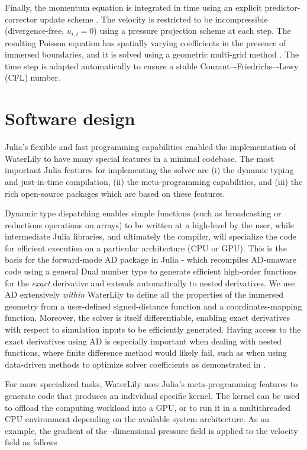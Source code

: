 \documentclass[10pt,a4paper]{article}
\begin{document}
Finally, the momentum equation is integrated in time using an explicit predictor-corrector update scheme \citep{Lauber2022}. The velocity is restricted to be incompressible (divergence-free, $u_{i,i}=0$) using a pressure projection scheme at each step. The resulting Poisson equation has spatially varying coefficients in the presence of immersed boundaries, and it is solved using a geometric multi-grid method \citep{Weymouth2022}. The time step is adapted automatically to ensure a stable Courant–-Friedrichs–-Lewy (CFL) number.

\section{Software design}\label{sec:software_design}

Julia’s flexible and fast programming capabilities enabled the implementation of WaterLily to have many special features in a minimal codebase. The most important Julia features for implementing the solver are (i) the dynamic typing and just-in-time compilation, (ii) the meta-programming capabilities, and (iii) the rich open-source packages which are based on these features.

Dynamic type dispatching enables simple functions (such as broadcasting or reductions operations on arrays) to be written at a high-level by the user, while intermediate Julia libraries, and ultimately the compiler, will specialize the code for efficient execution on a particular architecture (CPU or GPU). This is the basis for the forward-mode AD package in Julia - which recompiles AD-unaware code using a general Dual number type to generate efficient high-order functions for the \textit{exact} derivative and extends automatically to nested derivatives. We use AD extensively \textit{within} WaterLily to define all the properties of the immersed geometry from a user-defined signed-distance function and a coordinates-mapping function. Moreover, the solver is itself differentiable, enabling exact derivatives with respect to simulation inputs to be efficiently generated. Having access to the exact derivatives using AD is especially important when dealing with nested functions, where finite difference method would likely fail, such as when using data-driven methods to optimize solver coefficients as demonstrated in \cite{Weymouth2022}.

For more specialized tasks, WaterLily uses Julia's meta-programming features to generate code that produces an individual specific kernel. The kernel can be used to offload the computing workload into a GPU, or to run it in a multithreaded CPU environment depending on the available system architecture. As an example, the gradient of the -dimensional pressure field  is applied to the velocity field  as follows
\end{document}

